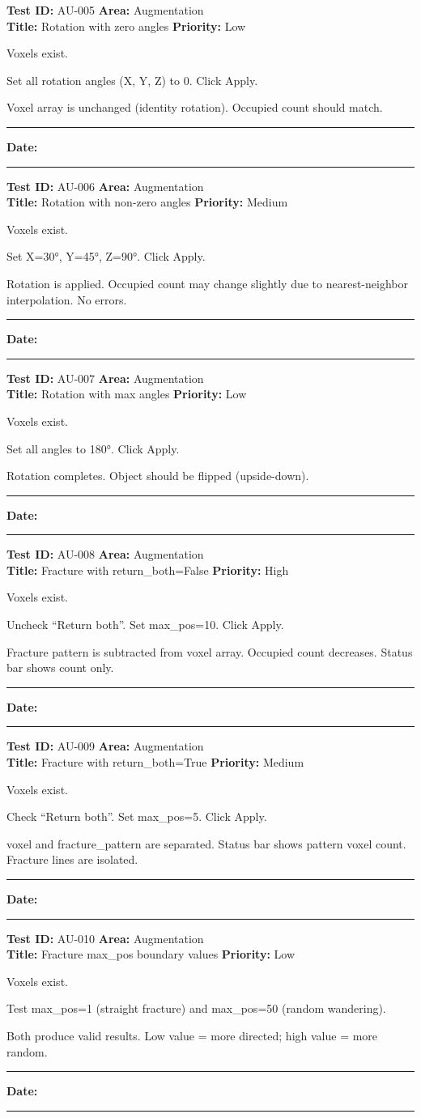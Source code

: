 \documentclass[12pt,a4paper]{article}
\newenvironment{testcase}[4]{%
  \smallskip
  \noindent\textbf{Test ID:} #1 \hfill \textbf{Area:} #2 \\
  \textbf{Title:} #3 \hfill \textbf{Priority:} #4
  \begin{description}[leftmargin=2em,style=nextline]
    \item[\textbf{Preconditions:}]
}{%
    \item[\textbf{Steps:}]
    \item[\textbf{Expected Result:}]
    \item[\textbf{Status:}] \rule{3cm}{0.4pt} \hspace{1em} \textbf{Date:} \rule{3cm}{0.4pt}
    \item[\textbf{Notes:}]
  \end{description}
  \smallskip
}
\begin{document}
\begin{testcase}{AU-005}{Augmentation}{Rotation with zero angles}{Low}
  \item Voxels exist.
  \item Set all rotation angles (X, Y, Z) to 0. Click Apply.
  \item Voxel array is unchanged (identity rotation). Occupied count should match.
\end{testcase}

\begin{testcase}{AU-006}{Augmentation}{Rotation with non-zero angles}{Medium}
  \item Voxels exist.
  \item Set X=30°, Y=45°, Z=90°. Click Apply.
  \item Rotation is applied. Occupied count may change slightly due to nearest-neighbor interpolation. No errors.
\end{testcase}

\begin{testcase}{AU-007}{Augmentation}{Rotation with max angles}{Low}
  \item Voxels exist.
  \item Set all angles to 180°. Click Apply.
  \item Rotation completes. Object should be flipped (upside-down).
\end{testcase}

\begin{testcase}{AU-008}{Augmentation}{Fracture with return\_both=False}{High}
  \item Voxels exist.
  \item Uncheck ``Return both''. Set max\_pos=10. Click Apply.
  \item Fracture pattern is subtracted from voxel array. Occupied count decreases. Status bar shows count only.
\end{testcase}

\begin{testcase}{AU-009}{Augmentation}{Fracture with return\_both=True}{Medium}
  \item Voxels exist.
  \item Check ``Return both''. Set max\_pos=5. Click Apply.
  \item voxel and fracture\_pattern are separated. Status bar shows pattern voxel count. Fracture lines are isolated.
\end{testcase}

\begin{testcase}{AU-010}{Augmentation}{Fracture max\_pos boundary values}{Low}
  \item Voxels exist.
  \item Test max\_pos=1 (straight fracture) and max\_pos=50 (random wandering).
  \item Both produce valid results. Low value = more directed; high value = more random.
\end{testcase}
\end{document}
